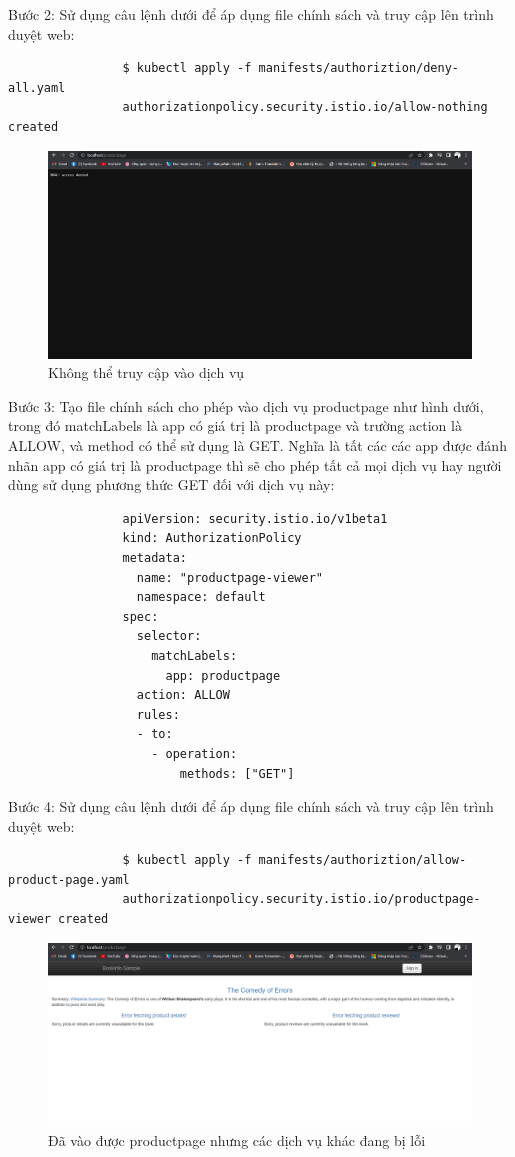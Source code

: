 \documentclass[14pt,a4paper]{book}
\begin{document}
{{				Bước 2: Sử dụng câu lệnh dưới để áp dụng file chính sách và truy cập lên trình duyệt web:
				\begin{lstlisting}
				$ kubectl apply -f manifests/authoriztion/deny-all.yaml 
				authorizationpolicy.security.istio.io/allow-nothing created
				\end{lstlisting}
				\begin{figure}[h]
					\centering
					\includegraphics[width=1\linewidth]{Pics/3.3.2-p1}
					\caption{Không thể truy cập vào dịch vụ}
					\label{fig:3}
				\end{figure}
			
				Bước 3: Tạo file chính sách cho phép vào dịch vụ productpage như hình dưới, trong đó matchLabels là app có giá trị là productpage và trường action là ALLOW, và method có thể sử dụng là GET. Nghĩa là tất các các app được đánh nhãn app có giá trị là productpage thì sẽ cho phép tất cả mọi dịch vụ hay người dùng sử dụng phương thức GET đối với dịch vụ này:
				\begin{lstlisting}
				apiVersion: security.istio.io/v1beta1
				kind: AuthorizationPolicy
				metadata:
				  name: "productpage-viewer"
				  namespace: default
				spec:
				  selector:
				    matchLabels:
				      app: productpage
				  action: ALLOW
				  rules:
				  - to:
				    - operation:
				        methods: ["GET"]
				\end{lstlisting}
				
				Bước 4: Sử dụng câu lệnh dưới để áp dụng file chính sách và truy cập lên trình duyệt web:
				\begin{lstlisting}
				$ kubectl apply -f manifests/authoriztion/allow-product-page.yaml 
				authorizationpolicy.security.istio.io/productpage-viewer created
				\end{lstlisting}
				\begin{figure}[h]
					\centering
					\includegraphics[width=0.7\linewidth]{Pics/3.3.2-p2}
					\caption{Đã vào được productpage nhưng các dịch vụ khác đang bị lỗi}
					\label{fig:3}
				\end{figure}
				
}}
\end{document}
